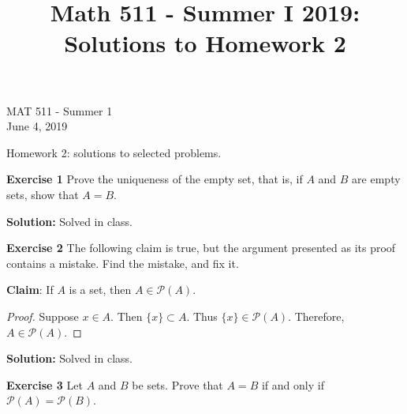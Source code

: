 \documentclass[12pt,oneside]{exam}
\title{Math 511 - Summer I 2019: Solutions to Homework 2}
\newenvironment{exercise}[1]{\vspace{.1in}\noindent\textbf{Exercise #1 \hspace{.05em}}}{}
\newenvironment{newsolution}{\vspace{.1in}\noindent\textbf{Solution: \hspace{.05em}}}{}
\begin{document}
\begin{flushright}
\sc MAT 511 - Summer 1\\
June 4, 2019
\end{flushright}
\bigskip

\begin{center}
\textsf{Homework 2: solutions to selected problems.} 
\end{center}


\begin{exercise}{1}
Prove the uniqueness of the empty set, that is, if $A$ and $B$ are empty sets, show that $A = B$. 
\end{exercise}

\begin{newsolution}
Solved in class.
\end{newsolution}

\begin{exercise}{2}
The following claim is true, but the argument presented as its proof contains a mistake. Find the mistake, and fix it. 

\textbf{Claim}: If $A$ is a set, then $A \in \mathcal{P}(A)$. 

\begin{proof}
Suppose $x \in A$. Then $\{x\} \subset A$. Thus $\{x\} \in \mathcal{P}(A)$. Therefore, $A \in \mathcal{P}(A)$.
\end{proof}
\end{exercise}

\begin{newsolution}
Solved in class.
\end{newsolution}

\begin{exercise}{3}
Let $A$ and $B$ be sets. Prove that $A = B$ if and only if $\mathcal{P}(A)=\mathcal{P}(B)$.
\end{exercise}
\end{document}
